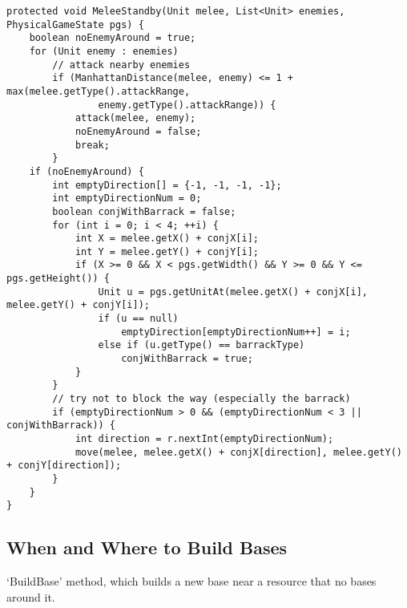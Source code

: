 \begin{verbatim}
protected void MeleeStandby(Unit melee, List<Unit> enemies, PhysicalGameState pgs) {
    boolean noEnemyAround = true;
    for (Unit enemy : enemies)
        // attack nearby enemies
        if (ManhattanDistance(melee, enemy) <= 1 + max(melee.getType().attackRange,
                enemy.getType().attackRange)) {
            attack(melee, enemy);
            noEnemyAround = false;
            break;
        }
    if (noEnemyAround) {
        int emptyDirection[] = {-1, -1, -1, -1};
        int emptyDirectionNum = 0;
        boolean conjWithBarrack = false;
        for (int i = 0; i < 4; ++i) {
            int X = melee.getX() + conjX[i];
            int Y = melee.getY() + conjY[i];
            if (X >= 0 && X < pgs.getWidth() && Y >= 0 && Y <= pgs.getHeight()) {
                Unit u = pgs.getUnitAt(melee.getX() + conjX[i], melee.getY() + conjY[i]);
                if (u == null)
                    emptyDirection[emptyDirectionNum++] = i;
                else if (u.getType() == barrackType)
                    conjWithBarrack = true;
            }
        }
        // try not to block the way (especially the barrack)
        if (emptyDirectionNum > 0 && (emptyDirectionNum < 3 || conjWithBarrack)) {
            int direction = r.nextInt(emptyDirectionNum);
            move(melee, melee.getX() + conjX[direction], melee.getY() + conjY[direction]);
        }
    }
}
\end{verbatim}

\subsection{When and Where to Build Bases}
‘BuildBase’ method, which builds a new base near a resource that no bases around it.

